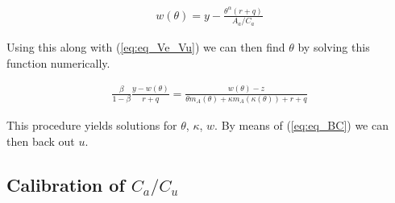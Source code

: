 \documentclass[11pt,article]{memoir}
\begin{document}
\begin{align}
w(\theta)=y-\frac{\theta^\alpha (r+q)}{A_a/C_a}
\end{align}

Using this along with (\ref{eq:eq_Ve_Vu}) we can then find $\theta$ by solving this function numerically.

\begin{align}
\frac{\beta}{1-\beta}\frac{y-w(\theta)}{r+q}=\frac{w(\theta)-z}{\theta m_A \left( \theta \right)+\kappa m_A \left( \kappa(\theta) \right)+r+q}
\end{align}

This procedure yields solutions for $\theta$, $\kappa$, $w$. By means of (\ref{eq:eq_BC}) we can then back out $u$.








\subsection{Calibration of $C_a/C_u$}
\label{app:CaCu}
\end{document}
